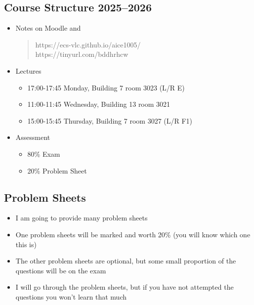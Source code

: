 \begin{slide}
\section{Course Structure 2025--2026}

\begin{PauseHighLight}
  \begin{itemize}
  \item Notes on Moodle and
    \begin{quote}
      https://ecs-vlc.github.io/aice1005/\\
      https://tinyurl.com/bddhrhcw\pause
    \end{quote}
  \item Lectures
    \begin{itemize}
    \item 17:00-17:45 Monday, Building 7 room 3023 (L/R E)
    \item 11:00-11:45 Wednesday, Building 13 room 3021
    \item 15:00-15:45 Thursday, Building 7 room 3027 (L/R F1) \pause
    \end{itemize}
  \item Assessment
    \begin{itemize}
    \item 80\% Exam
    \item 20\% Problem Sheet\pause
    \end{itemize}
  \end{itemize}
\end{PauseHighLight}

\end{slide}


\begin{slide}
\section{Problem Sheets}

\begin{PauseHighLight}
  \begin{itemize}
  \item I am going to provide many problem sheets\pause
  \item One problem sheets will be marked and worth 20\% (you will
    know which one this is)\pause
  \item The other problem sheets are optional, but some small
    proportion of the questions will be on the exam\pause
  \item I will go through the problem sheets, but if you have not
    attempted the questions you won't learn that much\pause
  \end{itemize}
\end{PauseHighLight}

\end{slide}

